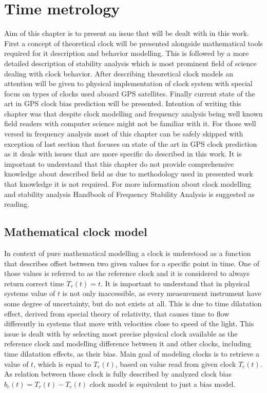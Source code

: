 \chapter{Time metrology}
Aim of this chapter is to present an issue that will be dealt with in this work.
First a concept of theoretical clock will be presented alongside mathematical tools required
for it description and behavior modelling.
This is followed by a more detailed description of stability analysis which is most prominent
field of science dealing with clock behavior.
After describing theoretical clock models an attention will be given to physical implementation
of clock system with special focus on types of clocks used aboard GPS satellites.
Finally current state of the art in GPS clock bias prediction will be presented.
Intention of writing this chapter was that despite clock modelling and frequency analysis being
well known field readers with computer science might not be familiar with it.
For those well versed in frequency analysis most of this chapter can be safely skipped with 
exception of last section that focuses on state of the art in GPS clock prediction as it 
deals with issues that are more specific do described in this work.
It is important to understand that this chapter do not provide comprehensive knowledge about
described field as due to methodology used in presented work that knowledge it is not required.
For more information about clock modelling and stability analysis Handbook of Frequency Stability
Analysis is suggested as reading.



\section{Mathematical clock model}
In context of pure mathematical modelling a clock is understood as a function that describes
offset between two given values for a specific point in time. One of those values is referred 
to as the reference clock and it is considered to always return correct time $T_{r}(t)=t$.
It is important to understand that in physical systems value of $t$ is not only inaccessible, as
every measurement instrument have some degree of uncertainty, but do not exists at all.
This is due to time dilatation effect, derived from special theory of relativity, that causes
time to flow differently in systems that move with velocities close to speed of the light.
This issue is dealt with by selecting most precise physical clock available as the reference
clock and modelling difference between it and other clocks, including time dilatation effects,
as their bias.
Main goal of modeling clocks is to retrieve a value of $t$, which is equal to $T_{r}(t)$, based
on value read from given clock $T_{c}(t)$. 
As relation between those clock is fully described by analyzed clock bias 
$b_{c}(t)=T_{r}(t)-T_{c}(t)$ clock model is equivalent to just a bias model.


